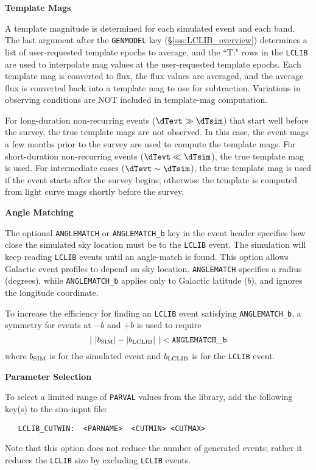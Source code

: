 \documentclass[12pt]{article}
\begin{document}
\medskip\centerline{\bf Template Mags}
A template magnitude is determined for each simulated event and each band.
The last argument after the {\tt GENMODEL} key  (\S\ref{sss:LCLIB_overview})
determines a list of user-requested template epochs to average, 
and  the ``T:" rows in the {\tt LCLIB} are used to interpolate
mag values at the user-requested template epochs. Each template mag 
is converted to flux, the flux values are averaged, and the average 
flux is converted back into a template mag to use for subtraction. 
Variations in observing conditions are NOT included in template-mag 
computation.

For long-duration non-recurring events ($\dTevt \gg \dTsim$)
that start well before the survey,
the true template mags are not observed. In this case, the event
mags a few months prior to the survey are used to compute the
template mags. For short-duration non-recurring events ($\dTevt \ll \dTsim$),
the true template mag is used. 
For intermediate cases ($\dTevt \sim \dTsim$), the true template mag is
used if the event starts after the survey begins; 
otherwise the template is computed from light curve mags 
shortly before the survey.

\newcommand{\bSIM}{b_{\rm SIM}}
\newcommand{\bLCLIB}{b_{\rm LCLIB}}
\bigskip\centerline{\bf Angle Matching}
The optional {\tt ANGLEMATCH} or {\tt ANGLEMATCH\_b} key in the event 
header specifies how close the simulated sky location must be to the 
{\tt LCLIB} event. The simulation will keep reading {\tt LCLIB} events 
until an angle-match is found. This option allows Galactic event
profiles to depend on sky location.
{\tt ANGLEMATCH} specifies a radius (degrees), while  {\tt ANGLEMATCH\_b}
applies only to Galactic latitude ($b$), and ignores the longitude coordinate.

To increase the efficiency for finding an {\tt LCLIB} event satisfying
{\tt ANGLEMATCH\_b}, a symmetry for events at $-b$ and $+b$ 
is used to require
\begin{equation}
     \vert ~ \vert \bSIM \vert - \vert \bLCLIB \vert ~ \vert < 
    {\rm\tt ANGLEMATCH\_b}
\end{equation}
%
where $\bSIM$ is for the simulated event and $\bLCLIB$  
is for the {\tt LCLIB} event.

\bigskip\centerline{\bf Parameter Selection}
To select a limited range of {\tt PARVAL} values from the library,
add the following key(s) to the sim-input file:
\begin{verbatim}
   LCLIB_CUTWIN:  <PARNAME>  <CUTMIN> <CUTMAX>
\end{verbatim}
Note that this option does not reduce the number of generated 
events; rather it reduces the {\tt LCLIB} size by excluding 
{\tt LCLIB} events.
\end{document}
